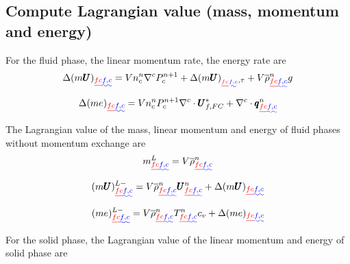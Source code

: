 \documentclass[preprint,12pt]{elsarticle}
\providecommand{\DIFadd}[1]{{\protect\color{blue}\uwave{#1}}} %
\providecommand{\DIFdel}[1]{{\protect\color{red}\sout{#1}}}                      %
\providecommand{\DIFaddbegin}{} %
\providecommand{\DIFaddend}{} %
\providecommand{\DIFdelbegin}{} %
\providecommand{\DIFdelend}{} %
\newcommand{\DIFscaledelfig}{0.5}
\newlength{\DIFdelgraphicswidth} %
\newlength{\DIFdelgraphicsheight} %
\newcommand{\DIFaddincludegraphics}[2][]{{\color{blue}\fbox{\DIFOincludegraphics[#1]{#2}}}} %
\newcommand{\DIFdelincludegraphics}[2][]{%
\sbox{\DIFdelgraphicsbox}{\DIFOincludegraphics[#1]{#2}}%
\settoboxwidth{\DIFdelgraphicswidth}{\DIFdelgraphicsbox} %
\settoboxtotalheight{\DIFdelgraphicsheight}{\DIFdelgraphicsbox} %
\scalebox{\DIFscaledelfig}{%
\parbox[b]{\DIFdelgraphicswidth}{\usebox{\DIFdelgraphicsbox}\\[-\baselineskip] \rule{\DIFdelgraphicswidth}{0em}}\llap{\resizebox{\DIFdelgraphicswidth}{\DIFdelgraphicsheight}{%
\setlength{\unitlength}{\DIFdelgraphicswidth}%
\begin{picture}(1,1)%
\thicklines\linethickness{2pt} %
{\color[rgb]{1,0,0}\put(0,0){\framebox(1,1){}}}%
{\color[rgb]{1,0,0}\put(0,0){\line( 1,1){1}}}%
{\color[rgb]{1,0,0}\put(0,1){\line(1,-1){1}}}%
\end{picture}%
}\hspace*{3pt}}} %
} %
\DeclareRobustCommand{\DIFaddbegin}{\DIFOaddbegin \let\includegraphics\DIFaddincludegraphics} %
\DeclareRobustCommand{\DIFaddend}{\DIFOaddend \let\includegraphics\DIFOincludegraphics} %
\DeclareRobustCommand{\DIFdelbegin}{\DIFOdelbegin \let\includegraphics\DIFdelincludegraphics} %
\DeclareRobustCommand{\DIFdelend}{\DIFOaddend \let\includegraphics\DIFOincludegraphics} %
\begin{document}
\subsection{\textsf{Compute Lagrangian value (mass, momentum and energy)}}
For the fluid phase, the linear momentum rate, the energy rate are\DIFaddbegin \DIFadd{:
}\DIFaddend \begin{equation}
 \Delta (m \pmb{U})_{\DIFdelbegin \DIFdel{fc}\DIFdelend \DIFaddbegin \DIFadd{f,c}\DIFaddend } = V n_c^n \nabla^c P_{c}^{n+1} +\Delta (m \pmb{U})_{\DIFdelbegin \DIFdel{_{fc}}\DIFdelend \DIFaddbegin \DIFadd{_{f,c}}\DIFaddend ,\tau} + V \overline{\rho}_{\DIFdelbegin \DIFdel{fc}\DIFdelend \DIFaddbegin \DIFadd{f,c}\DIFaddend }^n g
\end {equation}
%
%
\begin{equation}
 \Delta (me)_{\DIFdelbegin \DIFdel{fc}\DIFdelend \DIFaddbegin \DIFadd{f,c}\DIFaddend } = V n_c^n P_{c}^{n+1} \nabla^c \cdot \pmb{U}_{f,FC}^{*} + \nabla^c \cdot \pmb{q}_{\DIFdelbegin \DIFdel{fc}\DIFdelend \DIFaddbegin \DIFadd{f,c}\DIFaddend }^n
\end {equation}
%
%
The Lagrangian value of the mass, linear momentum and energy of fluid phases without momentum exchange are\DIFaddbegin \DIFadd{:
}\DIFaddend %
%
\begin{equation}
 m_{\DIFdelbegin \DIFdel{fc}\DIFdelend \DIFaddbegin \DIFadd{f,c}\DIFaddend }^L = V \overline{\rho}_{\DIFdelbegin \DIFdel{fc}\DIFdelend \DIFaddbegin \DIFadd{f,c}\DIFaddend }^n 
\end {equation}
%
%
\begin{equation}
 (m \pmb{U})_{\DIFdelbegin \DIFdel{fc}\DIFdelend \DIFaddbegin \DIFadd{f,c}\DIFaddend }^{L-} = V \overline{\rho}_{\DIFdelbegin \DIFdel{fc}\DIFdelend \DIFaddbegin \DIFadd{f,c}\DIFaddend }^n \pmb{U}_{\DIFdelbegin \DIFdel{fc}\DIFdelend \DIFaddbegin \DIFadd{f,c}\DIFaddend }^n + \Delta (m \pmb{U})_{\DIFdelbegin \DIFdel{fc}\DIFdelend \DIFaddbegin \DIFadd{f,c}\DIFaddend } 
\end {equation}
%
%
\begin{equation}
 (me)_{\DIFdelbegin \DIFdel{fc}\DIFdelend \DIFaddbegin \DIFadd{f,c}\DIFaddend }^{L-} = V \overline{\rho}_{\DIFdelbegin \DIFdel{fc}\DIFdelend \DIFaddbegin \DIFadd{f,c}\DIFaddend }^n T_{\DIFdelbegin \DIFdel{fc}\DIFdelend \DIFaddbegin \DIFadd{f,c}\DIFaddend }^n    c_v + \Delta (me)_{\DIFdelbegin \DIFdel{fc}\DIFdelend \DIFaddbegin \DIFadd{f,c}\DIFaddend } 
\end {equation}
%
%
For the solid phase, the Lagrangian value of the linear momentum and energy of solid phase are\DIFaddbegin \DIFadd{:
}\DIFaddend %
\end{document}
